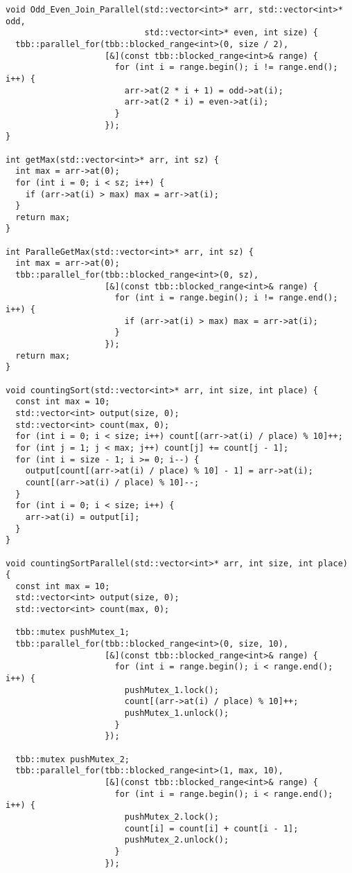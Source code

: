 \documentclass{report}
\begin{document}
\begin{lstlisting}
void Odd_Even_Join_Parallel(std::vector<int>* arr, std::vector<int>* odd,
                            std::vector<int>* even, int size) {
  tbb::parallel_for(tbb::blocked_range<int>(0, size / 2),
                    [&](const tbb::blocked_range<int>& range) {
                      for (int i = range.begin(); i != range.end(); i++) {
                        arr->at(2 * i + 1) = odd->at(i);
                        arr->at(2 * i) = even->at(i);
                      }
                    });
}

int getMax(std::vector<int>* arr, int sz) {
  int max = arr->at(0);
  for (int i = 0; i < sz; i++) {
    if (arr->at(i) > max) max = arr->at(i);
  }
  return max;
}

int ParalleGetMax(std::vector<int>* arr, int sz) {
  int max = arr->at(0);
  tbb::parallel_for(tbb::blocked_range<int>(0, sz),
                    [&](const tbb::blocked_range<int>& range) {
                      for (int i = range.begin(); i != range.end(); i++) {
                        if (arr->at(i) > max) max = arr->at(i);
                      }
                    });
  return max;
}

void countingSort(std::vector<int>* arr, int size, int place) {
  const int max = 10;
  std::vector<int> output(size, 0);
  std::vector<int> count(max, 0);
  for (int i = 0; i < size; i++) count[(arr->at(i) / place) % 10]++;
  for (int j = 1; j < max; j++) count[j] += count[j - 1];
  for (int i = size - 1; i >= 0; i--) {
    output[count[(arr->at(i) / place) % 10] - 1] = arr->at(i);
    count[(arr->at(i) / place) % 10]--;
  }
  for (int i = 0; i < size; i++) {
    arr->at(i) = output[i];
  }
}

void countingSortParallel(std::vector<int>* arr, int size, int place) {
  const int max = 10;
  std::vector<int> output(size, 0);
  std::vector<int> count(max, 0);

  tbb::mutex pushMutex_1;
  tbb::parallel_for(tbb::blocked_range<int>(0, size, 10),
                    [&](const tbb::blocked_range<int>& range) {
                      for (int i = range.begin(); i < range.end(); i++) {
                        pushMutex_1.lock();
                        count[(arr->at(i) / place) % 10]++;
                        pushMutex_1.unlock();
                      }
                    });

  tbb::mutex pushMutex_2;
  tbb::parallel_for(tbb::blocked_range<int>(1, max, 10),
                    [&](const tbb::blocked_range<int>& range) {
                      for (int i = range.begin(); i < range.end(); i++) {
                        pushMutex_2.lock();
                        count[i] = count[i] + count[i - 1];
                        pushMutex_2.unlock();
                      }
                    });


\end{lstlisting}
\end{document}
